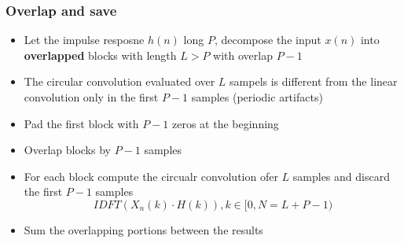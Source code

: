 \subsubsection{Overlap and save}
\begin{itemize}
    \item Let the impulse resposne $h(n)$ long $P$, decompose the input $x(n)$ into \textbf{overlapped} blocks with length $L>P$ with overlap $P-1$
    \item The circular convolution evaluated over $L$ sampels is different from the linear convolution only in the first $P-1$ samples (periodic artifacts)
    \item Pad the first block with $P-1$ zeros at the beginning
    \item Overlap blocks by $P-1$ samples
    \item For each block compute the circualr convolution ofer $L$ samples and discard the first $P-1$ samples
    $$IDFT(X_n(k)\cdot H(k)),k\in [0,N=L+P-1)$$
    \item Sum the overlapping portions between the results
\end{itemize}